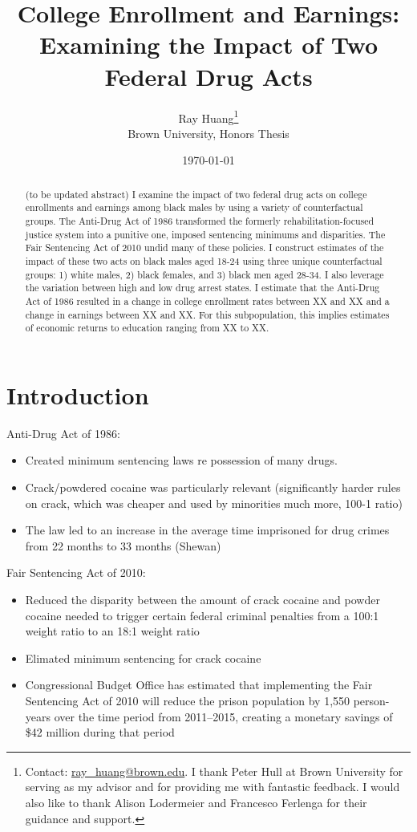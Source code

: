 \documentclass{article}
\title{College Enrollment and Earnings:
\texorpdfstring{\\}{} Examining the Impact of Two Federal Drug Acts}
\author{Ray Huang\thanks{Contact:
    \href{mailto:ray_huang@brown.edu}{ray\_huang@brown.edu}.
     I thank Peter Hull at Brown University for serving as my advisor and for providing me with fantastic feedback. I would also like to thank Alison Lodermeier and Francesco Ferlenga for their guidance and support.}
     \\Brown University, Honors Thesis}
\date{\today}
\begin{document}
\maketitle

\begin{abstract}
\noindent (to be updated abstract) I examine the impact of two federal drug acts on college enrollments and earnings among black males by using a variety of counterfactual groups. The Anti-Drug Act of 1986 transformed the formerly rehabilitation-focused justice system into a punitive one, imposed sentencing minimums and disparities. The Fair Sentencing Act of 2010 undid many of these policies. I construct estimates of the impact of these two acts on black males aged 18-24 using three unique counterfactual groups: 1) white males, 2) black females, and 3) black men aged 28-34. I also leverage the variation between high and low drug arrest states. I estimate that the Anti-Drug Act of 1986 resulted in a change in college enrollment rates between XX and XX and a change in earnings between XX and XX. For this subpopulation, this implies estimates of economic returns to education ranging from XX to XX.

\end{abstract}

\clearpage

\section*{Introduction}

Anti-Drug Act of 1986:
\begin{itemize}[itemsep=0.05mm, parsep=0pt]
  \item Created minimum sentencing laws re possession of many drugs. 
  \item Crack/powdered cocaine was particularly relevant (significantly harder rules on crack, which was cheaper and used by minorities much more, 100-1 ratio)
  \item The law led to an increase in the average time imprisoned for drug crimes from 22 months to 33 months (Shewan)
\end{itemize}


Fair Sentencing Act of 2010:
\begin{itemize}[itemsep=0.05mm, parsep=0pt]
  \item Reduced the disparity between the amount of crack cocaine and powder cocaine needed to trigger certain federal criminal penalties from a 100:1 weight ratio to an 18:1 weight ratio 
  \item Elimated minimum sentencing for crack cocaine 
  \item Congressional Budget Office has estimated that implementing the Fair Sentencing Act of 2010 will reduce the prison population by 1,550 person-years over the time period from 2011–2015, creating a monetary savings of \$42 million during that period 
\end{itemize}
\end{document}
